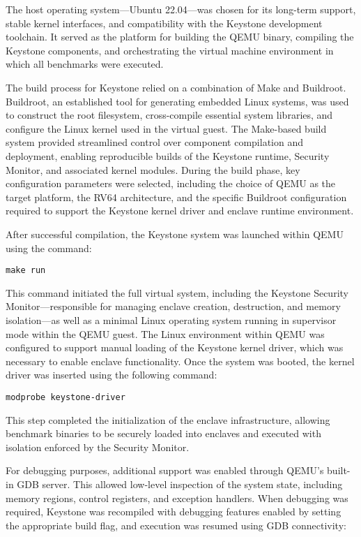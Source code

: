The host operating system—Ubuntu 22.04—was chosen for its long-term support, stable kernel interfaces, and compatibility with the Keystone development toolchain. It served as the platform for building the QEMU binary, compiling the Keystone components, and orchestrating the virtual machine environment in which all benchmarks were executed.

The build process for Keystone relied on a combination of Make and Buildroot. Buildroot, an established tool for generating embedded Linux systems, was used to construct the root filesystem, cross-compile essential system libraries, and configure the Linux kernel used in the virtual guest. The Make-based build system provided streamlined control over component compilation and deployment, enabling reproducible builds of the Keystone runtime, Security Monitor, and associated kernel modules. During the build phase, key configuration parameters were selected, including the choice of QEMU as the target platform, the RV64 architecture, and the specific Buildroot configuration required to support the Keystone kernel driver and enclave runtime environment.

After successful compilation, the Keystone system was launched within QEMU using the command:

\begin{verbatim}
make run
\end{verbatim}

This command initiated the full virtual system, including the Keystone Security Monitor—responsible for managing enclave creation, destruction, and memory isolation—as well as a minimal Linux operating system running in supervisor mode within the QEMU guest. The Linux environment within QEMU was configured to support manual loading of the Keystone kernel driver, which was necessary to enable enclave functionality. Once the system was booted, the kernel driver was inserted using the following command:

\begin{verbatim}
modprobe keystone-driver
\end{verbatim}

This step completed the initialization of the enclave infrastructure, allowing benchmark binaries to be securely loaded into enclaves and executed with isolation enforced by the Security Monitor.

For debugging purposes, additional support was enabled through QEMU’s built-in GDB server. This allowed low-level inspection of the system state, including memory regions, control registers, and exception handlers. When debugging was required, Keystone was recompiled with debugging features enabled by setting the appropriate build flag, and execution was resumed using GDB connectivity:

